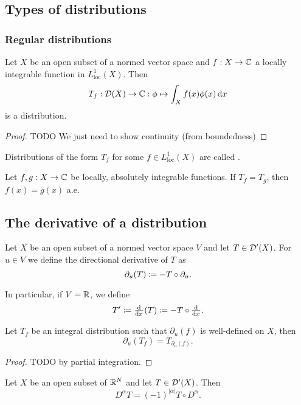 \subsection{Types of distributions}
\subsubsection{Regular distributions}
\begin{lemma}
Let $X$ be an open subset of a normed vector space and $f: X\to\mathbb{C}$ a locally integrable function in $L^1_\text{loc}(X)$. Then
\[ T_f: \operatorname{\mathcal{D}}(X) \to \mathbb{C}: \phi \mapsto \int_X f(x)\phi(x)\operatorname{d \!}{x} \]
is a distribution.
\end{lemma}
\begin{proof}
TODO We just need to show continuity (from boundedness)
\end{proof}

\begin{definition}
Distributions of the form $T_f$ for some $f\in L^1_\text{loc}(X)$ are called .
\end{definition}


\begin{lemma} \label{uniquenessIntegratedFunction}
Let $f,g: X\to \mathbb{C}$ be locally, absolutely integrable functions. If $T_f = T_g$, then $f(x) = g(x)$ a.e.
\end{lemma}


\subsection{The derivative of a distribution}
\begin{definition}
Let $X$ be an open subset of a normed vector space $V$ and let $T\in \operatorname{\mathcal{D}^\prime}(X)$. For $u\in V$ we define the directional derivative of $T$ as
\[ \partial_u(T) \coloneqq - T\circ \partial_u. \]

In particular, if $V = \mathbb{R}$, we define
\[ T' \defeq \od{}{x}(T) \defeq - T\circ \od{}{x}. \]
\end{definition}

\begin{lemma}
Let $T_f$ be an integral distribution such that $\partial_u(f)$ is well-defined on $X$, then
\[ \partial_u(T_f) = T_{\partial_{u}(f)}. \]
\end{lemma}
\begin{proof}
TODO by partial integration.
\end{proof}

\begin{lemma}
Let $X$ be an open subset of $\mathbb{R}^N$ and let $T\in \operatorname{\mathcal{D}^\prime}(X)$. Then
\[ D^\alpha T = (-1)^{|\alpha|}T\circ D^\alpha. \]
\end{lemma}

